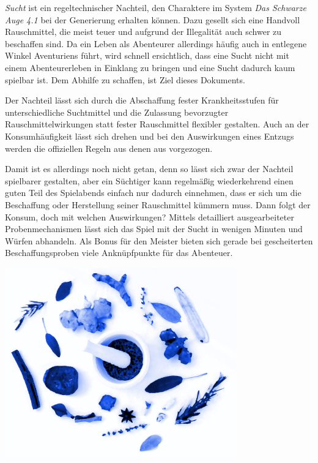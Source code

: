 \emph{Sucht} ist ein regeltechnischer Nachteil, den Charaktere im System \emph{Das Schwarze Auge 4.1} bei der Generierung erhalten können. Dazu gesellt sich eine Handvoll Rauschmittel, die meist teuer und aufgrund der Illegalität auch schwer zu beschaffen sind. Da ein Leben als Abenteurer allerdings häufig auch in entlegene Winkel Aventuriens führt, wird schnell ersichtlich, dass eine Sucht nicht mit einem Abenteurerleben in Einklang zu bringen und eine Sucht dadurch kaum spielbar ist. Dem Abhilfe zu schaffen, ist Ziel dieses Dokuments.

Der Nachteil lässt sich durch die Abschaffung fester Krankheitsstufen für unterschiedliche Suchtmittel und die Zulassung bevorzugter Rauschmittelwirkungen statt fester Rauschmittel flexibler gestalten. Auch an der Konsumhäufigkeit lässt sich drehen und bei den Auswirkungen eines Entzugs werden die offiziellen Regeln aus  denen aus  vorgezogen.

Damit ist es allerdings noch nicht getan, denn so lässt sich zwar der Nachteil spielbarer gestalten, aber ein Süchtiger kann regelmäßig wiederkehrend einen guten Teil des Spielabends einfach nur dadurch einnehmen, dass er sich um die Beschaffung oder Herstellung seiner Rauschmittel kümmern muss. Dann folgt der Konsum, doch mit welchen Auswirkungen? Mittels detailliert ausgearbeiteter Probenmechanismen lässt sich das Spiel mit der Sucht in wenigen Minuten und Würfen abhandeln. Als Bonus für den Meister bieten sich gerade bei gescheiterten Beschaffungsproben viele Anknüpfpunkte für das Abenteuer.

\vfill
\begin{center}
	\label{img-herbs-title}
	\includegraphics[width=10cm]{res/herbs-906140.png}
\end{center}
\newpage